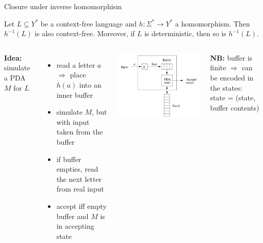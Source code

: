 \documentclass[handout]{beamer}
\begin{document}
\begin{frame}{Closure under inverse homomorphism}
    
    \begin{theorem}
        Let $L\subseteq Y^*$ be a context-free language and $h\colon\Sigma^*\to Y^*$ a homomorphism. Then $h^{-1}(L)$ is also context-free. Moreover, if $L$ is deterministic, then so is $h^{-1}(L)$.
    \end{theorem}

    \begin{columns}


        \textbf{Idea:} simulate a PDA $M$ for $L$

        \begin{itemize}
            \item read a letter $a$ $\Rightarrow$ place  $h(a)$ into an inner buffer
            \item simulate $M$, but with input taken from the buffer
            \item if buffer empties, read the next letter from real input
            \item accept iff empty buffer and $M$ is in accepting state
        \end{itemize}


        \vspace{-10pt}

        \begin{center}
            \includegraphics[width=\textwidth]{files/invHomoCFL.PNG}
        \end{center}

        \vspace{-15pt}

        \textbf{NB:} buffer is \alert{finite} $\Rightarrow$ can be encoded in the states:\\
        \alert{state} = (state, buffer contents)
        
    \end{columns}

\end{frame}
\end{document}
